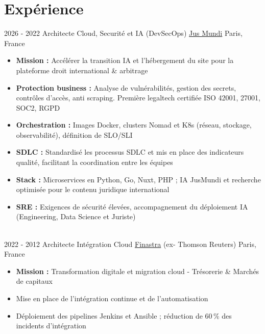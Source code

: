 \documentclass[letterpaper]{twentysecondcv} %
\begin{document}
\makeprofile %


\section{Expérience}

\begin{twentytimeline}
	\twentyitemtimeline{\faCloud}
		{2026 -}
		{2022}
		{Architecte Cloud, Securité et IA (DevSecOps)}
		{\href{https://www.jusmundi.com}{Jus Mundi}}
		{Paris, France}
		{\begin{itemize}
		\item \textbf{Mission :} Accélérer la transition IA et l'hébergement du site pour la plateforme droit international \& arbitrage
		\item \textbf{Protection business :} Analyse de vulnérabilités, gestion des secrets, contrôles d'accès, anti scraping. Première legaltech certifiée ISO 42001, 27001, SOC2, RGPD
		\item \textbf{Orchestration :} Images Docker, clusters Nomad et K8s (réseau, stockage, observabilité), définition de SLO/SLI
		\item \textbf{SDLC :} Standardisé les processus SDLC et mis en place des indicateurs qualité, facilitant la coordination entre les équipes
		\item \textbf{Stack :} Microservices en Python, Go, Nuxt, PHP ; IA JusMundi et recherche optimisée pour le contenu juridique international
		\item \textbf{SRE :} Exigences de sécurité élevées, accompagnement du déploiement IA (Engineering, Data Science et Juriste)
		\end{itemize}}
	\\
	\twentyitemtimeline{\faUsers}
		{2022 -}
		{2012}
		{Architecte Intégration Cloud}
		{\href{https://finastra.com}{Finastra} (ex- Thomson Reuters)}
		{Paris, France}
		{\begin{itemize}
		\item \textbf{Mission :} Transformation digitale et migration cloud - Trésorerie \& Marchés de capitaux
		\item Mise en place de l'intégration continue et de l'automatisation
		\item Déploiement des pipelines Jenkins et Ansible ; réduction de 60\,\% des incidents d'intégration

\end{itemize}}
\end{twentytimeline}
\end{document}
